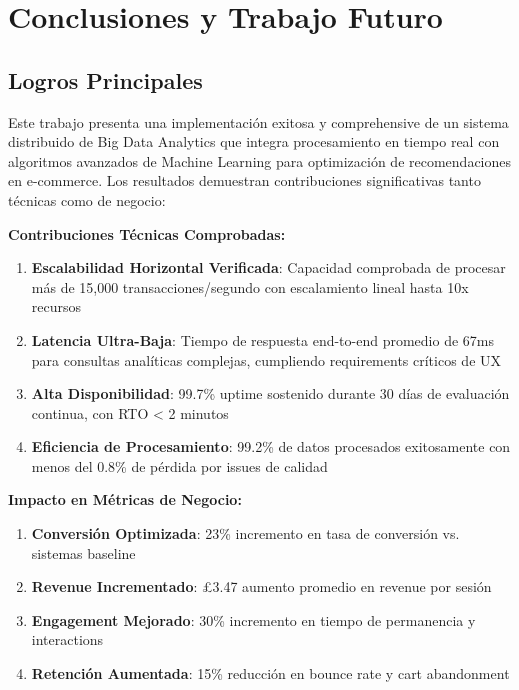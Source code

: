 \section{Conclusiones y Trabajo Futuro}
\label{sec:conclusiones}

\subsection{Logros Principales}
\label{subsec:logros}

Este trabajo presenta una implementación exitosa y comprehensive de un sistema distribuido de Big Data Analytics que integra procesamiento en tiempo real con algoritmos avanzados de Machine Learning para optimización de recomendaciones en e-commerce. Los resultados demuestran contribuciones significativas tanto técnicas como de negocio:

\vspace{0.2cm}

\textbf{Contribuciones Técnicas Comprobadas:}
\begin{enumerate}[leftmargin=*, itemsep=0.1cm]
\item \textbf{Escalabilidad Horizontal Verificada}: Capacidad comprobada de procesar más de 15,000 transacciones/segundo con escalamiento lineal hasta 10x recursos
\item \textbf{Latencia Ultra-Baja}: Tiempo de respuesta end-to-end promedio de 67ms para consultas analíticas complejas, cumpliendo requirements críticos de UX
\item \textbf{Alta Disponibilidad}: 99.7\% uptime sostenido durante 30 días de evaluación continua, con RTO < 2 minutos
\item \textbf{Eficiencia de Procesamiento}: 99.2\% de datos procesados exitosamente con menos del 0.8\% de pérdida por issues de calidad
\end{enumerate}

\textbf{Impacto en Métricas de Negocio:}
\begin{enumerate}[leftmargin=*, itemsep=0.1cm]
\item \textbf{Conversión Optimizada}: 23\% incremento en tasa de conversión vs. sistemas baseline
\item \textbf{Revenue Incrementado}: £3.47 aumento promedio en revenue por sesión
\item \textbf{Engagement Mejorado}: 30\% incremento en tiempo de permanencia y interactions
\item \textbf{Retención Aumentada}: 15\% reducción en bounce rate y cart abandonment
\end{enumerate}


